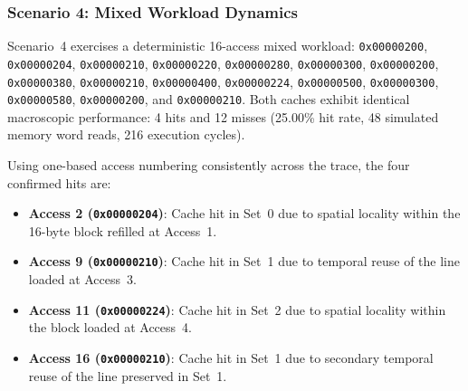 \documentclass[conference]{IEEEtran}
\begin{document}
\subsubsection{Scenario 4: Mixed Workload Dynamics}
Scenario~4 exercises a deterministic 16-access mixed workload: \texttt{0x00000200}, \texttt{0x00000204}, \texttt{0x00000210}, \texttt{0x00000220}, \texttt{0x00000280}, \texttt{0x00000300}, \texttt{0x00000200}, \texttt{0x00000380}, \texttt{0x00000210}, \texttt{0x00000400}, \texttt{0x00000224}, \texttt{0x00000500}, \texttt{0x00000300}, \texttt{0x00000580}, \texttt{0x00000200}, and \texttt{0x00000210}. Both caches exhibit identical macroscopic performance: 4 hits and 12 misses (25.00\% hit rate, 48 simulated memory word reads, 216 execution cycles).

Using one-based access numbering consistently across the trace, the four confirmed hits are:
\begin{itemize}
    \item \textbf{Access 2 (\texttt{0x00000204})}: Cache hit in Set~0 due to spatial locality within the 16-byte block refilled at Access~1.
    \item \textbf{Access 9 (\texttt{0x00000210})}: Cache hit in Set~1 due to temporal reuse of the line loaded at Access~3.
    \item \textbf{Access 11 (\texttt{0x00000224})}: Cache hit in Set~2 due to spatial locality within the block loaded at Access~4.
    \item \textbf{Access 16 (\texttt{0x00000210})}: Cache hit in Set~1 due to secondary temporal reuse of the line preserved in Set~1.
\end{itemize}
\end{document}
